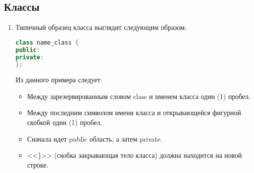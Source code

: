 \subsection{Классы}
\begin{enumerate}
	\item Типичный образец класса выглядит следующим образом:
	\begin{lstlisting}[language=C++,frame=tlBR]
class name_class {
public:
private:
};
	\end{lstlisting}
	Из данного примера следует:
	\begin{itemize}
		\item Между зарезервированным словом class и именем класса один (1) пробел.
		\item Между последним символом имени класса и открывающейся фигурной скобкой один (1) пробел.
		\item Сначала идет public область, а затем private.
		\item <<\}>> (скобка закрывающая тело класса) должна находится на новой строке.
	\end{itemize}


\end{enumerate}
